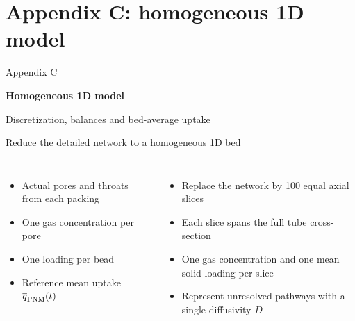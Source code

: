 \ifdefined\poreaccessappendixstarted\else\appendix{}\fi
\section[1D model]{Appendix C: homogeneous 1D model}
\begin{frame}{}
\vfill
{\large\color{tumgray}Appendix C}\par\vspace{0.4cm}
{\LARGE\color{tumblue}\textbf{Homogeneous 1D model}}\par\vspace{0.5cm}
{\large Discretization, balances and bed-average uptake}
\vfill
\end{frame}


\begin{frame}{Reduce the detailed network to a homogeneous 1D bed}

\begin{columns}[T,onlytextwidth]
\small
\begin{itemize}
\item Actual pores and throats from each packing
\item One gas concentration per pore
\item One loading per bead
\item Reference mean uptake $\overline q_{\rm PNM}(t)$
\end{itemize}
\small
\begin{itemize}
\item Replace the network by 100 equal axial slices
\item Each slice spans the full tube cross-section
\item One gas concentration and one mean solid loading per slice
\item Represent unresolved pathways with a single diffusivity $D$
\end{itemize}
\end{columns}
\vspace{0.25cm}

\end{frame}

